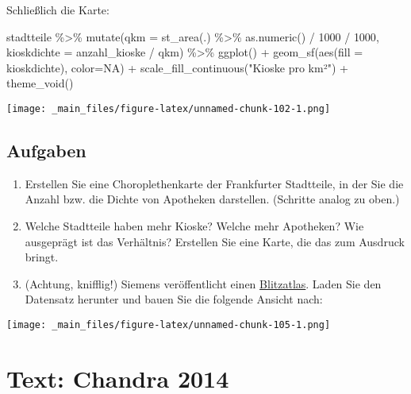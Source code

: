 \documentclass[11pt,german,a4paper]{article}
\newenvironment{Shaded}{\begin{snugshade}}{\end{snugshade}}
\newcommand{\AttributeTok}[1]{\textcolor[rgb]{0.77,0.63,0.00}{#1}}
\newcommand{\ConstantTok}[1]{\textcolor[rgb]{0.00,0.00,0.00}{#1}}
\newcommand{\DecValTok}[1]{\textcolor[rgb]{0.00,0.00,0.81}{#1}}
\newcommand{\FunctionTok}[1]{\textcolor[rgb]{0.00,0.00,0.00}{#1}}
\newcommand{\NormalTok}[1]{#1}
\newcommand{\SpecialCharTok}[1]{\textcolor[rgb]{0.00,0.00,0.00}{#1}}
\newcommand{\StringTok}[1]{\textcolor[rgb]{0.31,0.60,0.02}{#1}}
\begin{document}
Schließlich die Karte:

\begin{Shaded}
\begin{Highlighting}[]
\NormalTok{stadtteile }\SpecialCharTok{\%\textgreater{}\%}
  \FunctionTok{mutate}\NormalTok{(}\AttributeTok{qkm =} \FunctionTok{st\_area}\NormalTok{(.) }\SpecialCharTok{\%\textgreater{}\%} \FunctionTok{as.numeric}\NormalTok{() }\SpecialCharTok{/} \DecValTok{1000} \SpecialCharTok{/} \DecValTok{1000}\NormalTok{,}
         \AttributeTok{kioskdichte =}\NormalTok{ anzahl\_kioske }\SpecialCharTok{/}\NormalTok{ qkm) }\SpecialCharTok{\%\textgreater{}\%}
  \FunctionTok{ggplot}\NormalTok{() }\SpecialCharTok{+}
    \FunctionTok{geom\_sf}\NormalTok{(}\FunctionTok{aes}\NormalTok{(}\AttributeTok{fill =}\NormalTok{ kioskdichte), }\AttributeTok{color=}\ConstantTok{NA}\NormalTok{) }\SpecialCharTok{+}
    \FunctionTok{scale\_fill\_continuous}\NormalTok{(}\StringTok{"Kioske pro km²"}\NormalTok{) }\SpecialCharTok{+}
    \FunctionTok{theme\_void}\NormalTok{()}
\end{Highlighting}
\end{Shaded}

\texttt{[image: \_main\_files/figure-latex/unnamed-chunk-102-1.png]}

\hypertarget{aufgaben-4}{%
\subsection{Aufgaben}\label{aufgaben-4}}

\begin{enumerate}
\def\labelenumi{\arabic{enumi}.}
\item
  Erstellen Sie eine Choroplethenkarte der Frankfurter Stadtteile, in der Sie die Anzahl bzw. die Dichte von Apotheken darstellen. (Schritte analog zu oben.)
\item
  Welche Stadtteile haben mehr Kioske? Welche mehr Apotheken? Wie ausgeprägt ist das Verhältnis? Erstellen Sie eine Karte, die das zum Ausdruck bringt.
\item
  (Achtung, knifflig!) Siemens veröffentlicht einen \href{https://press.siemens.com/global/de/feature/wo-blitzt-es-am-haeufigsten}{Blitzatlas}. Laden Sie den Datensatz herunter und bauen Sie die folgende Ansicht nach:
\end{enumerate}

\texttt{[image: \_main\_files/figure-latex/unnamed-chunk-105-1.png]}

\hypertarget{text-chandra-2014}{%
\section{Text: Chandra 2014}\label{text-chandra-2014}}
\end{document}
